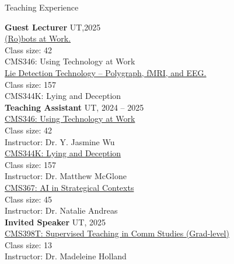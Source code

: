 \documentclass[
	11pt, %
]{resume} %
\begin{document}
\begin{rSection}{Teaching Experience}

    \textbf{Guest Lecturer} \hfill UT,2025\\ 
    \underline{(Ro)bots at Work.}\\ 
    \textbullet\enspace  Class size: 42\\
    \textbullet\enspace  CMS346: Using Technology at Work\\
    
    \underline{Lie Detection Technology – Polygraph, fMRI, and EEG.} \\
     \textbullet\enspace  Class size: 157\\
     \textbullet\enspace CMS344K: Lying and Deception\\
     
    \textbf{Teaching Assistant} \hfill UT, 2024 -- 2025 \\ 
    \underline{CMS346: Using Technology at Work}\\  
    \textbullet\enspace  Class size: 42\\
    \textbullet\enspace  Instructor: Dr. Y. Jasmine Wu\\
    
    \underline{CMS344K: Lying and Deception}\\
    \textbullet\enspace  Class size: 157\\
     \textbullet\enspace  Instructor: Dr. Matthew McGlone\\
     
    \underline{CMS367:  AI in Strategical Contexts}\\
    \textbullet\enspace  Class size: 45\\
    \textbullet\enspace  Instructor: Dr. Natalie Andreas\\


    \textbf{Invited Speaker} \hfill UT, 2025 \\ 
    \underline{CMS398T: Supervised Teaching in Comm Studies (Grad-level)}\\
     \textbullet\enspace  Class size: 13\\
     \textbullet\enspace  Instructor: Dr. Madeleine Holland\\



\end{rSection}
\end{document}
